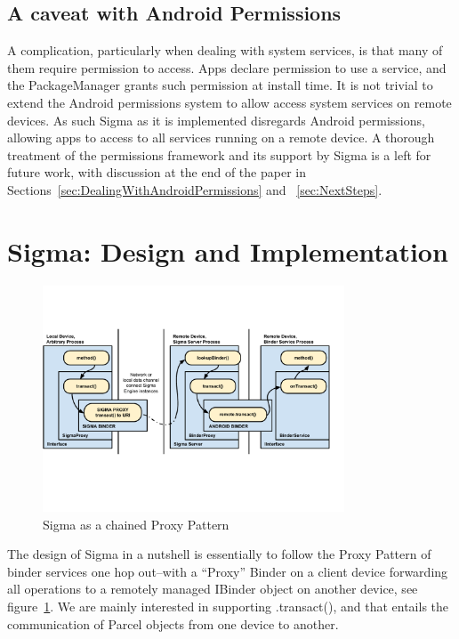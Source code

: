 \documentclass[prodmode]{acmlarge}
\begin{document}
\subsection{A caveat with Android Permissions}
A complication, particularly when dealing with system services, is that many of them require permission to access. Apps declare permission to use a service, and the PackageManager grants such permission at install time. It is not trivial to extend the Android permissions system to allow access system services on remote devices. As such Sigma as it is implemented disregards Android permissions, allowing apps to access to all services running on a remote device. A thorough treatment of the permissions framework and its support by Sigma is a left for future work, with discussion at the end of the paper in Sections~\ref{sec:DealingWithAndroidPermissions} and ~\ref{sec:NextSteps}.

\section{Sigma: Design and Implementation}
\label{sec:Sigma}
\begin{figure}[h]
\centering
\includegraphics[width=0.8\textwidth]{drawings/sigma_proxy_pattern.pdf}
\caption{Sigma as a chained Proxy Pattern}
\label{fig:SigmaChainProxy}
\end{figure}
The design of Sigma in a nutshell is essentially to follow the Proxy Pattern of binder services one hop out--with a ``Proxy'' Binder on a client device forwarding all operations to a remotely managed IBinder object on another device, see figure~\ref{fig:SigmaChainProxy}. We are mainly interested in supporting .transact(), and that entails the communication of Parcel objects from one device to another.
\end{document}
